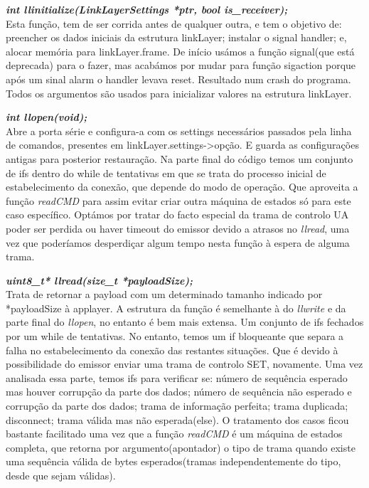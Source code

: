 \documentclass[a4paper]{article}
\begin{document}
\noindent\textbf{\textit{int llinitialize(LinkLayerSettings *ptr, bool
is\_receiver);}}\\
Esta função, tem de ser corrida antes de qualquer outra, e tem o objetivo de: preencher os dados iniciais da estrutura
linkLayer; instalar o signal handler; e, alocar memória para
linkLayer.frame. De início usámos a função signal(que
está deprecada) para o
fazer, mas acabámos por mudar para função sigaction porque após um sinal alarm
o handler levava reset. Resultado num crash do programa. Todos os argumentos
são usados para inicializar valores na estrutura linkLayer.\linebreak

\noindent\textbf{\textit{int llopen(void);}}\\
Abre a porta série e configura-a com os settings necessários passados pela linha de
comandos, presentes em linkLayer.settings->{opção}. E guarda as configurações
antigas para posterior restauração. Na parte final do código temos um conjunto
de ifs dentro do while de tentativas em que se trata do processo inicial de
estabelecimento da conexão, que depende do modo de operação. Que aproveita a função \textit{readCMD} para assim
evitar criar outra máquina de estados só para este caso específico. Optámos por
tratar do facto especial da trama de controlo UA poder ser
perdida ou haver timeout do emissor devido a atrasos no \textit{llread}, uma vez
que poderíamos desperdiçar algum tempo nesta função à espera de alguma trama.
\linebreak

\noindent\textbf{\textit{uint8\_t* llread(size\_t *payloadSize);}}\\
Trata de retornar a payload com um determinado tamanho indicado por
*payloadSize à applayer. A estrutura da função é semelhante à do
\textit{llwrite} e da parte final do \textit{llopen}, no entanto é bem mais
extensa. Um conjunto de ifs fechados por um while de tentativas. No entanto,
temos um if bloqueante que separa a falha no estabelecimento da conexão das
restantes situações. Que é devido à possibilidade do emissor enviar uma trama de controlo SET,
novamente. Uma vez analisada essa parte, temos ifs para verificar se: número de
sequência esperado mas houver corrupção da parte dos dados; número de
sequência não esperado e corrupção da parte dos dados; trama de informação
perfeita; trama duplicada; disconnect; trama válida mas não esperada(else). O
tratamento dos casos ficou bastante facilitado uma vez que a função
\textit{readCMD} é um máquina de estados completa, que retorna por
argumento(apontador) o tipo de trama quando existe uma sequência válida de
bytes esperados(tramas independentemente do tipo, desde que sejam válidas). \linebreak
\end{document}
